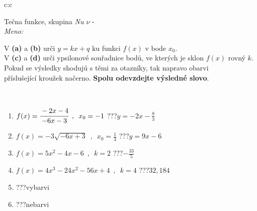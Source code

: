 \documentclass[10pt]{report}
\begin{document}
\newpage
\thispagestyle{empty}
\begin{tabular}{c:c}
\begin{minipage}[c][104.5mm][t]{0.5\linewidth}
\begin{center}
\vspace{7mm}
{\huge Tečna funkce, skupina \textit{Nu $\nu$} -}\\[5mm]
\textit{Meno:}\phantom{xxxxxxxxxxxxxxxxxxxxxxxxxxxxxxxxxxxxxxxxxxxxxxxxxxxxxxxxxxxxxxxxx}\\[5mm]
\begin{minipage}{0.95\linewidth}
\begin{center}
V \textbf{(a)} a \textbf{(b)} urči  $y = kx + q$ ku funkci $f(x)$ v bode $x_0$.\\V \textbf{(c)} a \textbf{(d)} urči ypsilonové souřadnice bodů, ve kterých je sklon $f(x)$ rovný $k$.\\Pokud se výsledky shodujú s těmi za otazníky, tak napravo obarvi\\příslušející kroužek načerno. \textbf{Spolu odevzdejte výsledné slovo}.
\end{center}
\end{minipage}
\\[1mm]
\begin{minipage}{0.79\linewidth}
\begin{center}
\begin{varwidth}{\linewidth}
\begin{enumerate}
\small
\item $f(x)=\cfrac{-2x-4}{-6x-3}\enspace , \enspace x_0=-1$\quad \dotfill\; ???\;\dotfill \quad $y = -2x-\frac{8}{3}$
\item $f(x)=-3\sqrt{-6x+3}\enspace , \enspace x_0=\frac{1}{3}$\quad \dotfill\; ???\;\dotfill \quad $y = 9x-6$
\item $f(x)=5x^2-4x-6\enspace , \enspace k=2$\quad \dotfill\; ???\;\dotfill \quad $-\frac{33}{5}$
\item $f(x)=4x^3-24x^2-56x+4\enspace , \enspace k=4$\quad \dotfill\; ???\;\dotfill \quad $32 , 184$
\item \quad \dotfill\; ???\;\dotfill \quad vybarvi
\item \quad \dotfill\; ???\;\dotfill \quad nebarvi
\end{enumerate}
\end{varwidth}
\end{center}
\end{minipage}
\begin{minipage}{0.20\linewidth}

\end{minipage}
\end{center}
\end{minipage}
\end{tabular}
\end{document}
